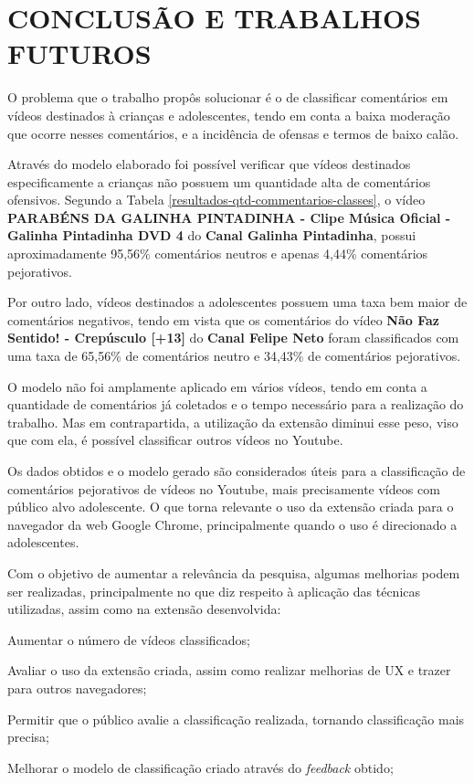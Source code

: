 \newpage
\section{CONCLUSÃO E TRABALHOS FUTUROS}
O problema que o trabalho propôs solucionar é o de classificar comentários em vídeos destinados à crianças e adolescentes, tendo em conta a baixa moderação que ocorre nesses comentários, e a incidência de ofensas e termos de baixo calão. 

Através do modelo elaborado foi possível verificar que vídeos destinados especificamente a crianças não possuem um quantidade alta de comentários ofensivos. Segundo a Tabela \ref{resultados-qtd-commentarios-classes}, o vídeo \textbf{PARABÉNS DA GALINHA PINTADINHA - Clipe Música Oficial - Galinha Pintadinha DVD 4} do \textbf{Canal Galinha Pintadinha}, possui aproximadamente 95,56\% comentários neutros e apenas 4,44\% comentários pejorativos.

Por outro lado, vídeos destinados a adolescentes possuem uma taxa bem maior de comentários negativos, tendo em vista que os comentários do vídeo \textbf{Não Faz Sentido! - Crepúsculo [+13]} do \textbf{Canal Felipe Neto} foram classificados com uma taxa de 65,56\% de comentários neutro e 34,43\% de comentários pejorativos.

O modelo não foi amplamente aplicado em vários vídeos, tendo em conta a quantidade de comentários já coletados e o tempo necessário para a realização do trabalho. Mas em contrapartida, a utilização da extensão diminui esse peso, viso que com ela, é possível classificar outros vídeos no Youtube.

Os dados obtidos e o modelo gerado são considerados úteis para a classificação de comentários pejorativos de vídeos no Youtube, mais precisamente vídeos com público alvo adolescente. O que torna relevante o uso da extensão criada para o navegador da web Google Chrome, principalmente quando o uso é direcionado a adolescentes.


Com o objetivo de aumentar a relevância da pesquisa, algumas melhorias podem ser realizadas, principalmente no que diz respeito à aplicação das técnicas utilizadas, assim como na extensão desenvolvida:

\begin{alineas}
    
    \item Aumentar o número de vídeos classificados;
    \item Avaliar o uso da extensão criada, assim como realizar melhorias de UX e trazer para outros navegadores;
    \item Permitir que o público avalie a classificação realizada, tornando classificação mais precisa;
    \item Melhorar o modelo de classificação criado através do \textit{feedback} obtido;
    
\end{alineas}

\newpage